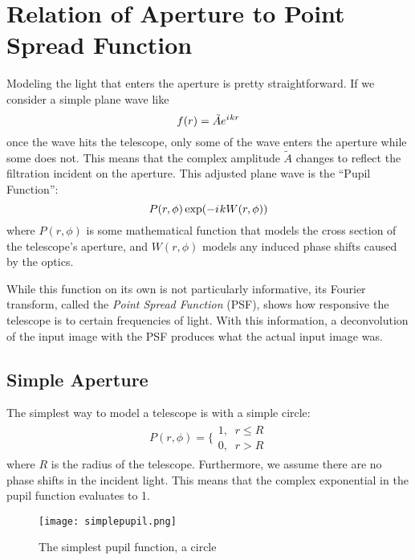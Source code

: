 \documentclass[%
 reprint,
 amsmath,amssymb,
 aps,
 pra,
]{revtex4-1}
\newcommand{\iu}{{i\mkern1mu}}
\begin{document}
{\section{\label{sec:aperture-psf}Relation of Aperture to Point Spread Function}

Modeling the light that enters the aperture is pretty straightforward. If we consider a simple plane wave like \[f(r)=\tilde{A}e^{\iu kr}\] once the wave hits the telescope, only some of the wave enters the aperture while some does not. This means that the complex amplitude $\tilde{A}$ changes to reflect the filtration incident on the aperture. This adjusted plane wave is the ``Pupil Function'':
\begin{equation}
  P(r, \phi)\exp(-\iu k W(r, \phi)) \label{eq:pupilFunc}
\end{equation}
where $P(r,\phi)$ is some mathematical function that models the cross section of the telescope's aperture, and $W(r, \phi)$ models any induced phase shifts caused by the optics.

While this function on its own is not particularly informative, its Fourier transform, called the \textit{Point Spread Function} (PSF), shows how responsive the telescope is to certain frequencies of light. With this information, a deconvolution of the input image with the PSF produces what the actual input image was.

\subsection{Simple Aperture} \label{subsec:simple-aperture}

The simplest way to model a telescope is with a simple circle:
\begin{align*}
  P(r, \phi) = \bigg\lbrace\begin{array}{c}
  	1,\;\;r \leq R \\ 
    0,\;\; r > R
  \end{array}
\end{align*}
where $R$ is the radius of the telescope. Furthermore, we assume there are no phase shifts in the incident light. This means that the complex exponential in the pupil function evaluates to 1.

\begin{figure}[h!]
  \centering
    \texttt{[image: simplepupil.png]}
  \caption{The simplest pupil function, a circle}
  \label{fig:simplepupil}
\end{figure}

}
\end{document}
